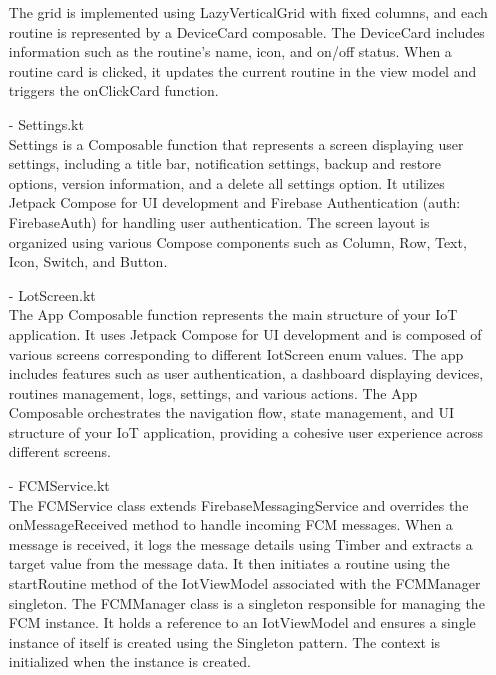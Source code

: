 \begin{enumerate}
                              The grid is implemented using LazyVerticalGrid with fixed columns, and each routine is represented by a DeviceCard composable. The DeviceCard includes information such as the routine's name, icon, and on/off status. When a routine card is clicked, it updates the current routine in the view model and triggers the onClickCard function.\\
                        \item[-] Settings.kt \\
                              Settings is a Composable function that represents a screen displaying user settings, including a title bar, notification settings, backup and restore options, version information, and a delete all settings option. It utilizes Jetpack Compose for UI development and Firebase Authentication (auth: FirebaseAuth) for handling user authentication. The screen layout is organized using various Compose components such as Column, Row, Text, Icon, Switch, and Button.\\
                        \item[-] LotScreen.kt \\
                              The App Composable function represents the main structure of your IoT application. It uses Jetpack Compose for UI development and is composed of various screens corresponding to different IotScreen enum values. The app includes features such as user authentication, a dashboard displaying devices, routines management, logs, settings, and various actions. The App Composable orchestrates the navigation flow, state management, and UI structure of your IoT application, providing a cohesive user experience across different screens.\\
                        \item[-] FCMService.kt \\
                              The FCMService class extends FirebaseMessagingService and overrides the onMessageReceived method to handle incoming FCM messages. When a message is received, it logs the message details using Timber and extracts a target value from the message data. It then initiates a routine using the startRoutine method of the IotViewModel associated with the FCMManager singleton.
                              The FCMManager class is a singleton responsible for managing the FCM instance. It holds a reference to an IotViewModel and ensures a single instance of itself is created using the Singleton pattern. The context is initialized when the instance is created.\\

\end{enumerate}
